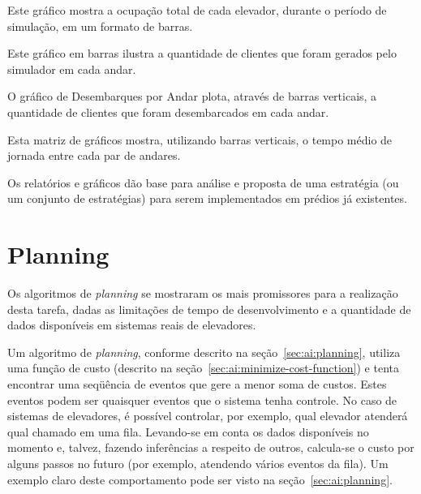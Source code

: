\begin{description}[leftmargin=!,labelwidth=\widthof{\bfseries Tempo de Jornada por Andar}]
  \item[Clientes por Elevador]
    Este gráfico mostra a ocupação total de cada elevador, durante o período de
    simulação, em um formato de barras.
  \item[Chegadas por Andar]
    Este gráfico em barras ilustra a quantidade de clientes que foram gerados pelo
    simulador em cada andar.
  \item[Desembarques por Andar]
    O gráfico de Desembarques por Andar plota, através de barras verticais, a
    quantidade de clientes que foram desembarcados em cada andar.
  \item[Tempo de Jornada por Andar]
    Esta matriz de gráficos mostra, utilizando barras verticais, o tempo médio de
    jornada entre cada par de andares.
\end{description}

Os relatórios e gráficos dão base para análise e proposta de uma estratégia (ou
um conjunto de estratégias) para serem implementados em prédios já existentes.

\section{\label{sec:objectives:planning}Planning}


Os algoritmos de \textit{planning} se mostraram os mais promissores para a
realização desta tarefa, dadas as limitações de tempo de desenvolvimento e a
quantidade de dados disponíveis em sistemas reais de elevadores.

Um algoritmo de \textit{planning}, conforme descrito na
seção~\ref{sec:ai:planning}, utiliza uma função de custo (descrito na
seção~\ref{sec:ai:minimize-cost-function}) e tenta encontrar uma seqüência de
eventos que gere a menor soma de custos. Estes eventos podem ser quaisquer
eventos que o sistema tenha controle. No caso de sistemas de elevadores, é
possível controlar, por exemplo, qual elevador atenderá qual chamado em uma
fila. Levando-se em conta os dados disponíveis no momento e, talvez, fazendo
inferências a respeito de outros, calcula-se o custo por alguns passos no futuro
(por exemplo, atendendo vários eventos da fila). Um exemplo claro deste
comportamento pode ser visto na seção~\ref{sec:ai:planning}.

